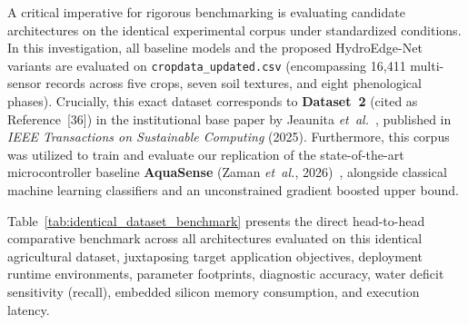 A critical imperative for rigorous benchmarking is evaluating candidate architectures on the identical experimental corpus under standardized conditions. In this investigation, all baseline models and the proposed HydroEdge-Net variants are evaluated on \texttt{cropdata\_updated.csv} (encompassing 16,411 multi-sensor records across five crops, seven soil textures, and eight phenological phases). Crucially, this exact dataset corresponds to \textbf{Dataset~2} (cited as Reference~[36]) in the institutional base paper by Jeaunita \textit{et~al.}~\cite{jeaunita2025multitask}, published in \textit{IEEE Transactions on Sustainable Computing} (2025). Furthermore, this corpus was utilized to train and evaluate our replication of the state-of-the-art microcontroller baseline \textbf{AquaSense} (Zaman \textit{et~al.}, 2026)~\cite{zaman2026aquasense}, alongside classical machine learning classifiers and an unconstrained gradient boosted upper bound.

Table~\ref{tab:identical_dataset_benchmark} presents the direct head-to-head comparative benchmark across all architectures evaluated on this identical agricultural dataset, juxtaposing target application objectives, deployment runtime environments, parameter footprints, diagnostic accuracy, water deficit sensitivity (recall), embedded silicon memory consumption, and execution latency.


